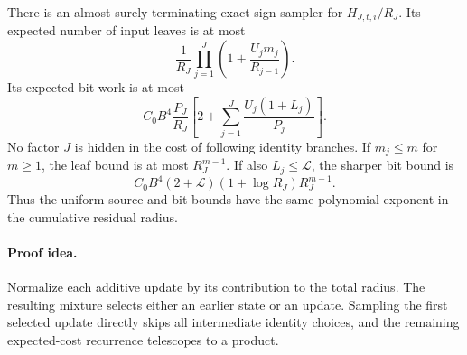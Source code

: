 \begin{theorem}
\label{thm:pn-abstract}
There is an almost surely terminating exact sign sampler for
$H_{J,t,i}/R_J$. Its expected number of input leaves is at most
\begin{equation}
 \frac1{R_J}\prod_{j=1}^J
       \left(1+\frac{U_jm_j}{R_{j-1}}\right).
 \label{eq:pn-leaf-product}
\end{equation}
Its expected bit work is at most
\begin{equation}
 C_0B^4\frac{P_J}{R_J}
 \left[2+\sum_{j=1}^J\frac{U_j(1+L_j)}{P_j}\right].
 \label{eq:pn-bit-product}
\end{equation}
No factor $J$ is hidden in the cost of following identity branches.
If $m_j\le m$ for $m\ge1$, the leaf bound is at most $R_J^{m-1}$.
If also $L_j\le\mathcal L$, the sharper bit bound is
\begin{equation}
 C_0B^4(2+\mathcal L)(1+\log R_J)R_J^{m-1}.
 \label{eq:pn-sharp-bit-bound}
\end{equation}
Thus the uniform source and bit bounds have the same polynomial
exponent in the cumulative residual radius.
\end{theorem}
\paragraph{Proof idea.}
Normalize each additive update by its contribution to the total
radius. The resulting mixture selects either an earlier state or an update.
Sampling the first selected update directly skips all intermediate identity
choices, and the remaining expected-cost recurrence telescopes to a product.

